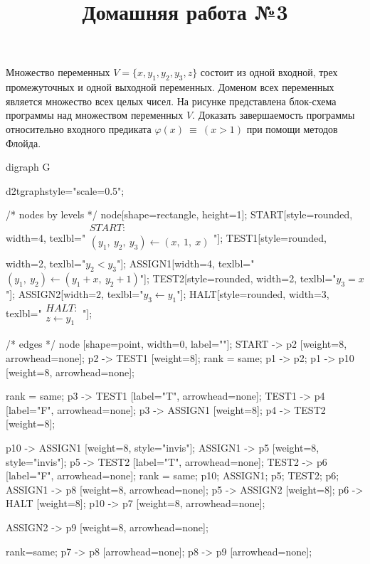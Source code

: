 \documentclass[12pt, a4paper]{article}
\title{Домашняя работа №3}
\date{}
\author{}
\begin{document}
\maketitle

Множество переменных $V = \{ x, y_1, y_2, y_3, z \}$ состоит из одной входной, трех промежуточных и одной выходной переменных. Доменом всех переменных является множество всех целых чисел. На рисунке представлена блок-схема программы над множеством переменных $V$. Доказать завершаемость программы относительно входного предиката $\varphi(x)~\equiv~(x > 1)$ при помощи методов Флойда.

\hspace{2cm}

\begin{dot2tex}[options=-traw]
	digraph G{
		d2tgraphstyle="scale=0.5";

		/* nodes by levels */
		node[shape=rectangle, height=1];
		START[style=rounded, width=4, texlbl="$\begin{matrix}START:\\ (y_1,~y_2,~y_3) \leftarrow (x,~1,~x)\\\end{matrix}$"];
        TEST1[style=rounded, width=2, texlbl="$y_2 < y_3$"];
        ASSIGN1[width=4, texlbl="$(y_1,~y_2) \leftarrow (y_1 + x,~y_2 + 1)$"];
        TEST2[style=rounded, width=2, texlbl="$y_3 = x$"];
        ASSIGN2[width=2, texlbl="$y_3 \leftarrow y_1$"];
		HALT[style=rounded, width=3, texlbl="$\begin{matrix}HALT:\\ z \leftarrow y_1\end{matrix}$"];

        /* edges */
		node [shape=point, width=0, label=""];
		START -> p2 [weight=8, arrowhead=none]; p2 -> TEST1 [weight=8];
        {rank = same; p1 -> p2; }
        p1 -> p10 [weight=8, arrowhead=none];

        {rank = same; p3 -> TEST1 [label="T", arrowhead=none]; TEST1 -> p4 [label="F", arrowhead=none]; }
		p3 -> ASSIGN1 [weight=8];
		p4 -> TEST2 [weight=8];

        p10 -> ASSIGN1 [weight=8, style="invis"];
        ASSIGN1 -> p5 [weight=8, style="invis"];
        p5 -> TEST2 [label="T", arrowhead=none];
        TEST2 -> p6 [label="F", arrowhead=none];
        {rank = same; p10; ASSIGN1; p5; TEST2; p6; }
        ASSIGN1 -> p8 [weight=8, arrowhead=none];
		p5 -> ASSIGN2 [weight=8];
		p6 -> HALT [weight=8];
        p10 -> p7 [weight=8, arrowhead=none];

		ASSIGN2 -> p9 [weight=8, arrowhead=none];

        { rank=same; p7 -> p8 [arrowhead=none]; p8 -> p9 [arrowhead=none]; }
	}
\end{dot2tex}
\end{document}

